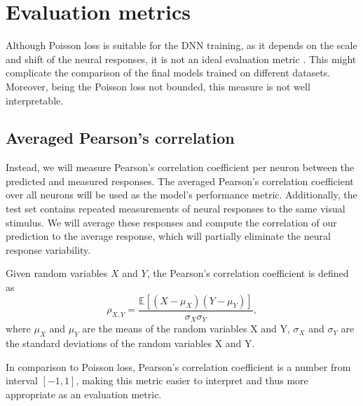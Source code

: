\section{Evaluation metrics}\label{metrics_section}

Although Poisson loss is suitable for the DNN training, as it depends on the scale and shift of the neural responses, it is not an ideal evaluation metric \citep{willeke2022sensorium}. This might complicate the comparison of the final models trained on different datasets. Moreover, being the Poisson loss not bounded, this measure is not well interpretable.

\subsection{Averaged Pearson’s correlation}


Instead, we will measure Pearson’s correlation coefficient per neuron between the predicted and measured responses. The averaged Pearson’s correlation coefficient over all neurons will be used as the model’s performance metric. Additionally, the test set contains repeated measurements of neural responses to the same visual stimulus. We will average these responses and compute the correlation of our prediction to the average response, which will partially eliminate the neural response variability.

\begin{defn}\label{def01:9}
	Given random variables $X$ and $Y$, the Pearson's correlation coefficient is defined as
	\begin{equation}
		\rho_{X, Y} = \frac{\mathbb{E}\left[(X - \mu_X)(Y - \mu_Y)\right]}{\sigma_X \sigma_Y},
	\end{equation}
	where $\mu_X$ and $\mu_Y$ are the means of the random variables X and Y, $\sigma_X$ and $\sigma_Y$ are the standard deviations of the random variables X and Y.
\end{defn}


In comparison to Poisson loss, Pearson’s correlation coefficient is a number from interval $[-1, 1]$, making this metric easier to interpret and thus more appropriate as an evaluation metric.











